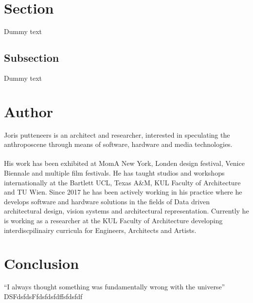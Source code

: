 \documentclass{article}
\begin{document}
\section{Section}
Dummy text
\subsection{Subsection}
Dummy text



\section{Author}
Joris putteneers is an architect and researcher, interested in speculating the anthroposcene through means of software, hardware and media technologies.\\
\\ 
His work has been exhibited at MomA New York, Londen design festival, Venice Biennale and multiple film festivals. He has taught studios and workshops internationally at the Bartlett UCL, Texas A\&M, KUL Faculty of Architecture and TU Wien. Since 2017 he has been actively working in his practice where he develops software and hardware solutions in the fields of Data driven architectural design, vision systems and architectural representation. Currently he is working as a researcher at the KUL Faculty of Architecture developing interdiscpilinairy curricula for Engineers, Architects and Artists. \\





\section{Conclusion}
``I always thought something was fundamentally wrong with the universe'' \citep{adams1995hitchhiker}\\
DSFdsfdsFfdsfdsfdffsfdsfdf


% 
\end{document}
